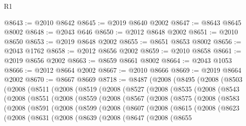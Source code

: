 \begin{lexlean}{R1}
\begin{coremodule}
@8643 := @2010 @8642
@8645 := @2019 @8640 @2002
@8647 := @8643 @8645 @8002
@8648 := @2043 @646
@8650 := @2012 @8648 @2002
@8651 := @2010 @8650
@8653 := @2019 @8648 @2002
@8655 := @8651 @8653 @8002
@8656 := @2043 @1762
@8658 := @2012 @8656 @2002
@8659 := @2010 @8658
@8661 := @2019 @8656 @2002
@8663 := @8659 @8661 @8002
@8664 := @2043 @1053
@8666 := @2012 @8664 @2002
@8667 := @2010 @8666
@8669 := @2019 @8664 @2002
@8670 := @8667 @8669
@8718 := @8487
    (@2008
      (@8495
        (@2008
          (@8503
            (@2008
              (@8511
                (@2008
                  (@8519
                    (@2008
                      (@8527
                        (@2008
                          (@8535
                            (@2008
                              (@8543
                                (@2008
                                  (@8551
                                    (@2008
                                      (@8559
                                        (@2008
                                          (@8567
                                            (@2008
                                              (@8575
                                                (@2008
                                                  (@8583
                                                    (@2008
                                                      (@8591
                                                        (@2008
                                                          (@8599
                                                            (@2008
                                                              (@8607
                                                                (@2008
                                                                  (@8615
                                                                    (@2008
                                                                      (@8623
                                                                        (@2008
                                                                          (@8631
                                                                            (@2008
                                                                              (@8639
                                                                                (@2008
                                                                                  (@8647
                                                                                    (@2008
                                                                                      (@8655

\end{coremodule}
\end{lexlean}
